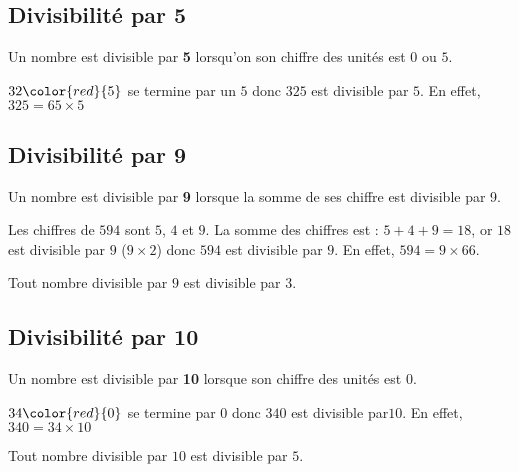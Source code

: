 \begin{pageCours}
\subsection{Divisibilité par 5}

\begin{minipage}{0.5\linewidth}
\begin{Pp}
Un nombre est divisible par \textbf{5} lorsqu'on son chiffre des unités est $0$ ou $5$.
\end{Pp} 
\end{minipage}
\begin{minipage}{0.5\linewidth}
\begin{Ex}
$32\color{red}{5}$ se termine par un $5$ donc $325$ est divisible par $5$. En effet, $325 = 65\times5$
\end{Ex} 
\end{minipage}

\subsection{Divisibilité par 9}

 
\begin{minipage}{0.5\linewidth}
\begin{Pp}
Un nombre est divisible par \textbf{9} lorsque la somme de ses chiffre est divisible par 9.
\end{Pp} 
\end{minipage}
\begin{minipage}{0.5\linewidth}
\begin{Ex}
Les chiffres de $594$ sont $5$, $4$ et $9$. La somme des chiffres est : $5+4+9 = 18$, or $18$ est divisible par $9$ ($9\times2$) donc $594$ est divisible par $9$. En effet, \(594=9\times66\).
\end{Ex} 
\end{minipage}

\begin{Pp}
Tout nombre divisible par $9$ est divisible par $3$.
\end{Pp}

 
\subsection{Divisibilité par 10}


\begin{minipage}{0.5\linewidth}
\begin{Pp}
Un nombre est divisible par \textbf{10} lorsque son chiffre des unités est $0$.
\end{Pp} 
\end{minipage}
\begin{minipage}{0.5\linewidth}
\begin{Ex}
$34\color{red}{0}$ se termine  par $0$ donc $340$ est divisible par$10$. En effet, $340=34\times10$
\end{Ex} 
\end{minipage}

\begin{Pp}
Tout nombre divisible par $10$ est divisible par $5$.
\end{Pp}


\end{pageCours} 




